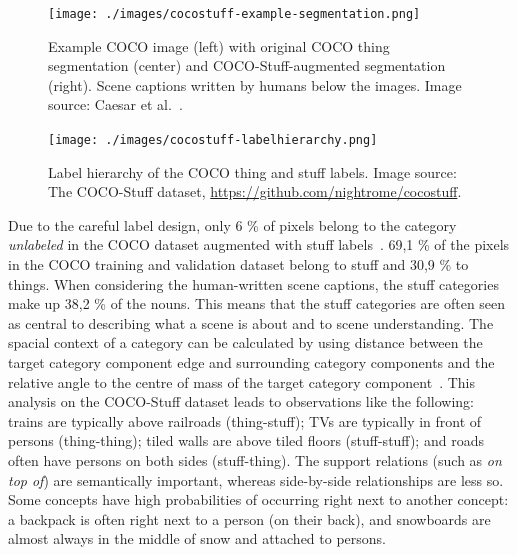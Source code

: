 \documentclass[english,twoside,openright]{HYgraduMLDS}
\begin{document}
\begin{figure}[h] 
\centering
\texttt{[image: ./images/cocostuff-example-segmentation.png]}
\caption{Example COCO image (left) with original COCO thing segmentation (center) and COCO-Stuff-augmented segmentation (right). Scene captions written by humans below the images. Image source: Caesar et al.~\cite{CocoStuff}.}
\label{fig:cocostuff-example-segmentation} 
\end{figure}

\begin{figure}[h] 
\centering
\texttt{[image: ./images/cocostuff-labelhierarchy.png]}
\caption{Label hierarchy of the COCO thing and stuff labels. Image source: The COCO-Stuff dataset, \url{https://github.com/nightrome/cocostuff}.}
\label{fig:coco-labels} 
\end{figure}

Due to the careful label design, only 6 \% of pixels belong to the category \textit{unlabeled} in the COCO dataset augmented with stuff labels~\cite{CocoStuff}. 69,1 \% of the pixels in the COCO training and validation dataset belong to stuff and 30,9 \% to things. When considering the human-written scene captions, the stuff categories make up 38,2 \% of the nouns. This means that the stuff categories are often seen as central to describing what a scene is about and to scene understanding. The spacial context of a category can be calculated by using distance between the target category component edge and surrounding category components and the relative angle to the centre of mass of the target category component~\cite{CocoStuff}. This analysis on the COCO-Stuff dataset leads to observations like the following: trains are typically above railroads (thing-stuff); TVs are typically in front of persons (thing-thing); tiled walls are above tiled floors (stuff-stuff); and roads often have persons on both sides (stuff-thing). The support relations (such as \textit{on top of}) are semantically important, whereas side-by-side relationships are less so. Some concepts have high probabilities of occurring right next to another concept: a backpack is often right next to a person (on their back), and snowboards are almost always in the middle of snow and attached to persons.
\end{document}
